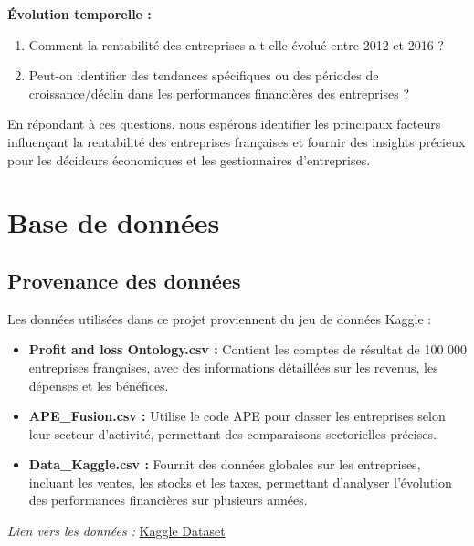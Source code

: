 \documentclass[mstat,12pt]{unswthesis}
\begin{document}
\textbf{Évolution temporelle :}

\begin{enumerate}
\def\labelenumi{\alph{enumi}.}
\item
  Comment la rentabilité des entreprises a-t-elle évolué entre 2012 et
  2016 ?
\item
  Peut-on identifier des tendances spécifiques ou des périodes de
  croissance/déclin dans les performances financières des entreprises ?
\end{enumerate}

\medskip

En répondant à ces questions, nous espérons identifier les principaux
facteurs influençant la rentabilité des entreprises françaises et
fournir des insights précieux pour les décideurs économiques et les
gestionnaires d'entreprises.

\chapter{Base de données}\label{base-de-donnuxe9es}

\section{Provenance des données}\label{provenance-des-donnuxe9es}

Les données utilisées dans ce projet proviennent du jeu de données
Kaggle : \medskip

\begin{itemize}[label=$\circ$]
  \item \textnormal{\textbf{Profit and loss \- Ontology.csv :} Contient les comptes de résultat de 100 000 entreprises françaises, avec des informations détaillées sur les revenus, les dépenses et les bénéfices.}
  
  \item \textnormal{\textbf{APE\_Fusion.csv :} Utilise le code APE pour classer les entreprises selon leur secteur d’activité, permettant des comparaisons sectorielles précises.}

  \item \textnormal{\textbf{Data\_Kaggle.csv :} Fournit des données globales sur les entreprises, incluant les ventes, les stocks et les taxes, permettant d'analyser l’évolution des performances financières sur plusieurs années.}
\end{itemize}

\medskip

\textit{Lien vers les données :}
\href{https://www.kaggle.com/datasets/briaclg/financial-data-of-french-compagnies/data?select=Profit+and+loss+-+Onthology.csv}{Kaggle Dataset}
\end{document}
